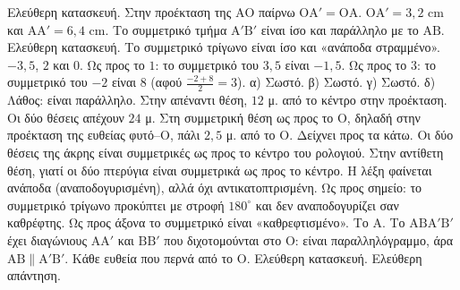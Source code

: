  Ελεύθερη κατασκευή. Στην προέκταση της $\mathrm{ΑΟ}$ παίρνω $\mathrm{ΟΑ}'=\mathrm{ΟΑ}$.
 $\mathrm{ΟΑ}'=3{,}2$ cm και $\mathrm{ΑΑ}'=6{,}4$ cm.
 Το συμμετρικό τμήμα $\mathrm{Α}'\mathrm{Β}'$ είναι ίσο και παράλληλο με το $\mathrm{ΑΒ}$.
 Ελεύθερη κατασκευή. Το συμμετρικό τρίγωνο είναι ίσο και «ανάποδα στραμμένο».
 $-3{,}5$, $2$ και $0$.
 Ως προς το $1$: το συμμετρικό του $3{,}5$ είναι $-1{,}5$. Ως προς το $3$: το συμμετρικό του $-2$ είναι $8$ (αφού $\frac{-2+8}{2}=3$).
 α) Σωστό. β) Σωστό. γ) Σωστό. δ) Λάθος: είναι παράλληλο.
 Στην απέναντι θέση, $12$ μ. από το κέντρο στην προέκταση. Οι δύο θέσεις απέχουν $24$ μ.
 Στη συμμετρική θέση ως προς το $\mathrm{Ο}$, δηλαδή στην προέκταση της ευθείας φυτό--$\mathrm{Ο}$, πάλι $2{,}5$ μ. από το $\mathrm{Ο}$.
 Δείχνει προς τα κάτω. Οι δύο θέσεις της άκρης είναι συμμετρικές ως προς το κέντρο του ρολογιού.
 Στην αντίθετη θέση, γιατί οι δύο πτερύγια είναι συμμετρικά ως προς το κέντρο.
 Η λέξη φαίνεται ανάποδα (αναποδογυρισμένη), αλλά όχι αντικατοπτρισμένη.
 Ως προς σημείο: το συμμετρικό τρίγωνο προκύπτει με στροφή $180^\circ$ και δεν αναποδογυρίζει σαν καθρέφτης. Ως προς άξονα το συμμετρικό είναι «καθρεφτισμένο».
 Το $\mathrm{Α}$.
 Το $\mathrm{ΑΒΑ}'\mathrm{Β}'$ έχει διαγώνιους $\mathrm{ΑΑ}'$ και $\mathrm{ΒΒ}'$ που διχοτομούνται στο $\mathrm{Ο}$: είναι παραλληλόγραμμο, άρα $\mathrm{ΑΒ}\parallel\mathrm{Α}'\mathrm{Β}'$.
 Κάθε ευθεία που περνά από το $\mathrm{Ο}$.
 Ελεύθερη κατασκευή.
 Ελεύθερη απάντηση.
